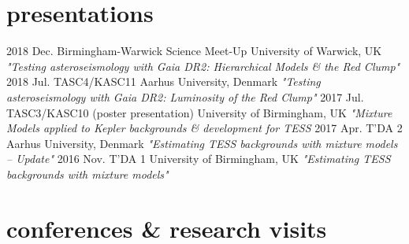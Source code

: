 \documentclass[]{k-cv} %
\begin{document}

\section{presentations}

\begin{entrylist}
\entry
{2018 Dec.}
{Birmingham-Warwick Science Meet-Up}
{University of Warwick, UK}
{\emph{"Testing asteroseismology with \textit{Gaia} DR2: Hierarchical Models \& the Red Clump"}}
\entry
{2018 Jul.}
{TASC4/KASC11}
{Aarhus University, Denmark}
{\emph{"Testing asteroseismology with \textit{Gaia} DR2: Luminosity of the Red Clump"}}
\entry
{2017 Jul.}
{TASC3/KASC10 (poster presentation)}
{University of Birmingham, UK}
{\emph{"Mixture Models applied to \emph{Kepler} backgrounds \& development for TESS}}
\entry
{2017 Apr.}
{T'DA 2}
{Aarhus University, Denmark}
{\emph{"Estimating TESS backgrounds with mixture models -- Update"}}
\entry
{2016 Nov.}
{T'DA 1}
{University of Birmingham, UK}
{\emph{"Estimating TESS backgrounds with mixture models"}}
\end{entrylist}

\section{conferences \& research visits}
\end{document}
